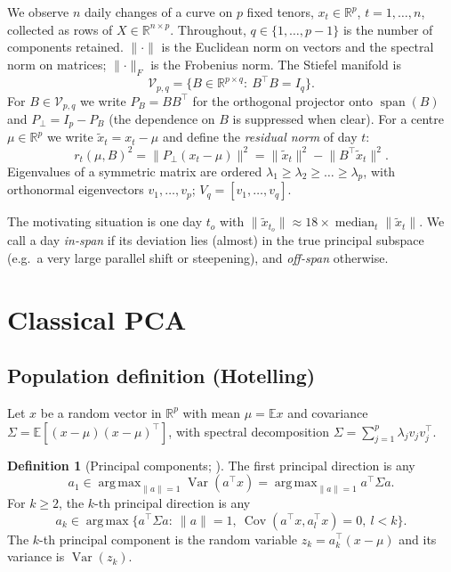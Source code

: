 \documentclass[11pt]{article}
\theoremstyle{definition}
\newtheorem{definition}[theorem]{Definition}
\theoremstyle{remark}
\DeclareMathOperator{\spn}{span}
\DeclareMathOperator*{\argmax}{arg\,max}
\DeclareMathOperator{\Var}{Var}
\DeclareMathOperator{\Cov}{Cov}
\newcommand{\R}{\mathbb{R}}
\newcommand{\E}{\mathbb{E}}
\newcommand{\V}{\mathcal{V}}
\newcommand{\norm}[1]{\lVert #1\rVert}
\newcommand{\tx}{\tilde{x}}
\newcommand{\Pp}{P_{\!\perp}}
\begin{document}
We observe $n$ daily changes of a curve on $p$ fixed tenors,
$x_t\in\R^p$, $t=1,\dots,n$, collected as rows of $X\in\R^{n\times p}$.
Throughout, $q\in\{1,\dots,p-1\}$ is the number of components retained.
$\norm{\cdot}$ is the Euclidean norm on vectors and the spectral norm on matrices;
$\norm{\cdot}_F$ is the Frobenius norm.
The Stiefel manifold is
\[
\V_{p,q}=\{B\in\R^{p\times q}:\ B^\top B=I_q\}.
\]
For $B\in\V_{p,q}$ we write $P_B=BB^\top$ for the orthogonal projector onto $\spn(B)$ and
$\Pp=I_p-P_B$ (the dependence on $B$ is suppressed when clear).
For a centre $\mu\in\R^p$ we write $\tx_t=x_t-\mu$ and define the \emph{residual norm} of day $t$:
\begin{equation}\label{eq:resid}
r_t(\mu,B)^2=\norm{\Pp(x_t-\mu)}^2=\norm{\tx_t}^2-\norm{B^\top\tx_t}^2 .
\end{equation}
Eigenvalues of a symmetric matrix are ordered $\lambda_1\ge\lambda_2\ge\dots\ge\lambda_p$,
with orthonormal eigenvectors $v_1,\dots,v_p$; $V_q=[v_1,\dots,v_q]$.

The motivating situation is one day $t_o$ with $\norm{\tx_{t_o}}\approx 18\times
\operatorname{median}_t\norm{\tx_t}$. We call a day \emph{in-span} if its deviation lies (almost) in
the true principal subspace (e.g.\ a very large parallel shift or steepening), and
\emph{off-span} otherwise.

\section{Classical PCA}\label{sec:classical}

\subsection{Population definition (Hotelling)}

Let $x$ be a random vector in $\R^p$ with mean $\mu=\E x$ and covariance
$\Sigma=\E[(x-\mu)(x-\mu)^\top]$, with spectral decomposition
$\Sigma=\sum_{j=1}^p\lambda_jv_jv_j^\top$.

\begin{definition}[Principal components; \citealp{Hotelling1933}]\label{def:hotelling}
The first principal direction is any
\[
a_1\in\argmax_{\norm{a}=1}\Var(a^\top x)=\argmax_{\norm{a}=1}a^\top\Sigma a .
\]
For $k\ge2$, the $k$-th principal direction is any
\[
a_k\in\argmax\bigl\{a^\top\Sigma a:\ \norm{a}=1,\ \Cov(a^\top x,a_l^\top x)=0,\ l<k\bigr\}.
\]
The $k$-th principal component is the random variable $z_k=a_k^\top(x-\mu)$ and its variance
is $\Var(z_k)$.
\end{definition}
\end{document}
